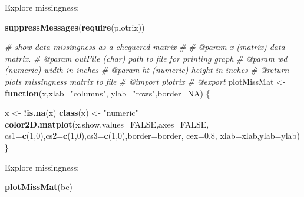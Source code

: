 \documentclass[
]{book}
\newenvironment{Shaded}{\begin{snugshade}}{\end{snugshade}}
\newcommand{\AttributeTok}[1]{\textcolor[rgb]{0.13,0.29,0.53}{#1}}
\newcommand{\CommentTok}[1]{\textcolor[rgb]{0.56,0.35,0.01}{\textit{#1}}}
\newcommand{\ConstantTok}[1]{\textcolor[rgb]{0.56,0.35,0.01}{#1}}
\newcommand{\ControlFlowTok}[1]{\textcolor[rgb]{0.13,0.29,0.53}{\textbf{#1}}}
\newcommand{\DecValTok}[1]{\textcolor[rgb]{0.00,0.00,0.81}{#1}}
\newcommand{\FloatTok}[1]{\textcolor[rgb]{0.00,0.00,0.81}{#1}}
\newcommand{\FunctionTok}[1]{\textcolor[rgb]{0.13,0.29,0.53}{\textbf{#1}}}
\newcommand{\NormalTok}[1]{#1}
\newcommand{\OtherTok}[1]{\textcolor[rgb]{0.56,0.35,0.01}{#1}}
\newcommand{\SpecialCharTok}[1]{\textcolor[rgb]{0.81,0.36,0.00}{\textbf{#1}}}
\newcommand{\StringTok}[1]{\textcolor[rgb]{0.31,0.60,0.02}{#1}}
\begin{document}
Explore missingness:

\begin{Shaded}
\begin{Highlighting}[]
\FunctionTok{suppressMessages}\NormalTok{(}\FunctionTok{require}\NormalTok{(plotrix))}

\CommentTok{\#\textquotesingle{} show data missingness as a chequered matrix}
\CommentTok{\#\textquotesingle{} }
\CommentTok{\#\textquotesingle{} @param x (matrix) data matrix.}
\CommentTok{\#\textquotesingle{} @param outFile (char) path to file for printing graph}
\CommentTok{\#\textquotesingle{} @param wd (numeric) width in inches}
\CommentTok{\#\textquotesingle{} @param ht (numeric) height in inches}
\CommentTok{\#\textquotesingle{} @return plots missingness matrix to file}
\CommentTok{\#\textquotesingle{} @import plotrix}
\CommentTok{\#\textquotesingle{} @export}
\NormalTok{plotMissMat }\OtherTok{\textless{}{-}} \ControlFlowTok{function}\NormalTok{(x,}\AttributeTok{xlab=}\StringTok{"columns"}\NormalTok{,}
        \AttributeTok{ylab=}\StringTok{"rows"}\NormalTok{,}\AttributeTok{border=}\ConstantTok{NA}\NormalTok{) \{}
    
\NormalTok{    x }\OtherTok{\textless{}{-}} \SpecialCharTok{!}\FunctionTok{is.na}\NormalTok{(x)}
    \FunctionTok{class}\NormalTok{(x) }\OtherTok{\textless{}{-}} \StringTok{"numeric"}
    \FunctionTok{color2D.matplot}\NormalTok{(x,}\AttributeTok{show.values=}\ConstantTok{FALSE}\NormalTok{,}\AttributeTok{axes=}\ConstantTok{FALSE}\NormalTok{,}
        \AttributeTok{cs1=}\FunctionTok{c}\NormalTok{(}\DecValTok{1}\NormalTok{,}\DecValTok{0}\NormalTok{),}\AttributeTok{cs2=}\FunctionTok{c}\NormalTok{(}\DecValTok{1}\NormalTok{,}\DecValTok{0}\NormalTok{),}\AttributeTok{cs3=}\FunctionTok{c}\NormalTok{(}\DecValTok{1}\NormalTok{,}\DecValTok{0}\NormalTok{),}\AttributeTok{border=}\NormalTok{border,}
        \AttributeTok{cex=}\FloatTok{0.8}\NormalTok{,}
        \AttributeTok{xlab=}\NormalTok{xlab,}\AttributeTok{ylab=}\NormalTok{ylab)}
\NormalTok{\}}
\end{Highlighting}
\end{Shaded}

Explore missingness:

\begin{Shaded}
\begin{Highlighting}[]
\FunctionTok{plotMissMat}\NormalTok{(bc)}
\end{Highlighting}
\end{Shaded}
\end{document}
